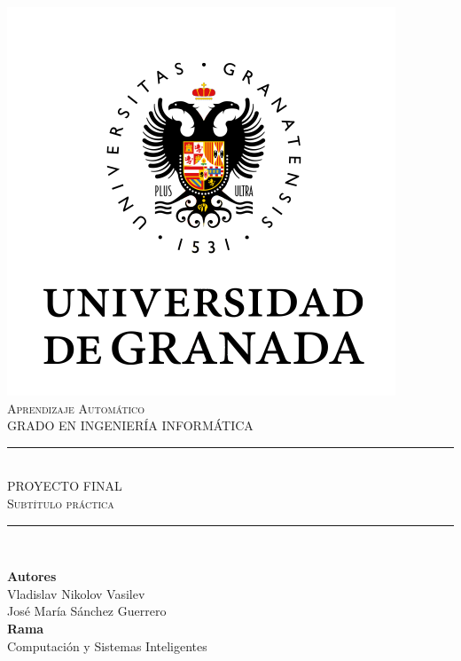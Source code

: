 \documentclass[11pt,a4paper]{article}
\newcommand{\asignatura}{Aprendizaje Automático}
\newcommand{\autor}{Vladislav Nikolov Vasilev}
\begin{document}

\begin{titlepage}

\begin{minipage}{\textwidth}

\centering

\includegraphics[scale=0.5]{img/ugr.png}\\

\textsc{\Large \asignatura{}\\[0.2cm]}
\textsc{GRADO EN INGENIERÍA INFORMÁTICA}\\[1cm]

\noindent\rule[-1ex]{\textwidth}{1pt}\\[1.5ex]
\textsc{{\Huge PROYECTO FINAL\\[0.5ex]}}
\textsc{{\Large Subtítulo práctica\\}}
\noindent\rule[-1ex]{\textwidth}{2pt}\\[3.5ex]

\end{minipage}

\vspace{0.5cm}

\begin{minipage}{\textwidth}

\centering

\textbf{Autores}\\ {\autor{}}\\{José María Sánchez Guerrero}\\[2ex]
\textbf{Rama}\\ {Computación y Sistemas Inteligentes}\\[2ex]
\vspace{0.3cm}


\end{minipage}
\end{titlepage}
\end{document}

